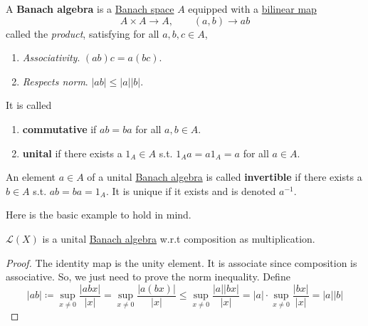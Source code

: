 	\begin{definition}
	  \label{def:banach-algebra}
	  A \textbf{Banach algebra} is a \hyperref[mv-def:banach-space]{Banach space} $A$ equipped with a \hyperref[lin-def:bilinear-map]{bilinear map} 
		\begin{equation}
		  A \times A \to A, \qquad (a, b) \to ab
		\end{equation}
		called the \textit{product}, satisfying for all $a, b, c \in A$, 
		\begin{enumerate}
		  \item \textit{Associativity}. $(ab)c = a(bc)$. 
			\item \textit{Respects norm}. $|ab| \leq |a| |b|$. 
		\end{enumerate}
		It is called 
		\begin{enumerate}
		  \item \textbf{commutative} if $ab = ba$ for all $a, b \in A$. 
			\item \textbf{unital} if there exists a $1_A \in A$ s.t. $1_A a = a 1_A = a$ for all $a \in A$. 
		\end{enumerate}
	\end{definition}

	\begin{definition}
	  \label{def:invertible-element-of-a-banach-algebra}
		An element $a \in A$ of a unital \hyperref[def:banach-algebra]{Banach algebra} is called \textbf{invertible} if there exists a $b \in A$ s.t. $ab = ba = 1_A$. It is unique if it exists and is denoted $a^{-1}$. 
	\end{definition}

	Here is the basic example to hold in mind. 

	\begin{theorem}
	  \label{thm:banach-algebra-of-bounded-linear-endomorphisms}
		$\mathcal{L}(X)$ is a unital \hyperref[def:banach-algebra]{Banach algebra} w.r.t composition as multiplication. 
	\end{theorem}
	\begin{proof}
	  The identity map is the unity element. It is associate since composition is associative. So, we just need to prove the norm inequality. Define 
		\begin{equation}
			|ab| \coloneqq \sup_{x \neq 0} \frac{|abx|}{|x|} = \sup_{x \neq 0} \frac{|a(bx)|}{|x|} \leq \sup_{x \neq 0} \frac{|a| |bx|}{|x|} = |a| \cdot \sup_{x \neq 0} \frac{|bx|}{|x|} = |a| |b|
		\end{equation}
	\end{proof}

